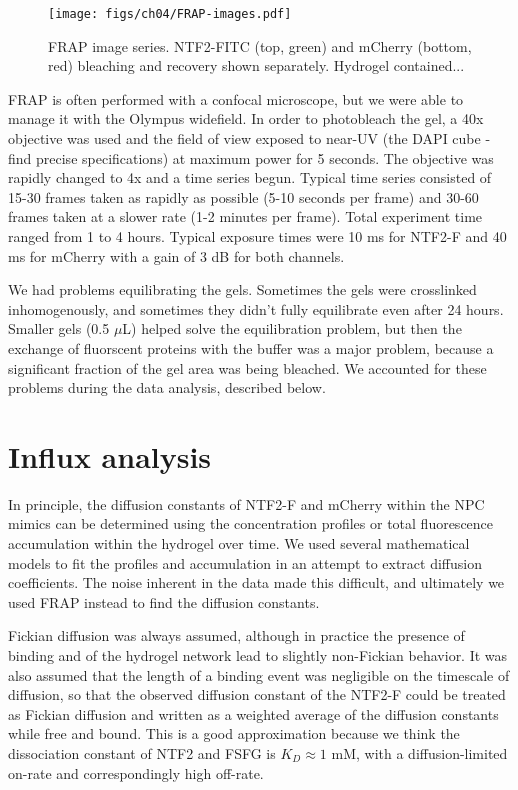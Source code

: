 \begin{figure} %

\caption{FRAP image series. NTF2-FITC (top, green) and mCherry (bottom, red) bleaching and recovery shown separately.  Hydrogel contained... }
\centering
\texttt{[image: figs/ch04/FRAP-images.pdf]}
\label{fig:frap-images}
\end{figure} 

FRAP is often performed with a confocal microscope, but we were able to manage it with the Olympus widefield.  In order to photobleach the gel, a 40x objective was used and the field of view exposed to near-UV (the DAPI cube - find precise specifications) at maximum power for 5 seconds.  The objective was rapidly changed to 4x and a time series begun.  Typical time series consisted of 15-30 frames taken as rapidly as possible (5-10 seconds per frame) and 30-60 frames taken at a slower rate (1-2 minutes per frame).  Total experiment time ranged from 1 to 4 hours.  Typical exposure times were 10 ms for NTF2-F and 40 ms for mCherry with a gain of 3 dB for both channels.

We had problems equilibrating the gels.  Sometimes the gels were crosslinked inhomogenously, and sometimes they didn't fully equilibrate even after 24 hours.  Smaller gels (0.5 $\mu$L) helped solve the equilibration problem, but then the exchange of fluorscent proteins with the buffer was a major problem, because a significant fraction of the gel area was being bleached.  We accounted for these problems during the data analysis, described below.

\section{Influx analysis}
In principle, the diffusion constants of NTF2-F and mCherry within the NPC mimics can be determined using the concentration profiles or total fluorescence accumulation within the hydrogel over time.  We used several mathematical models to fit the profiles and accumulation in an attempt to extract diffusion coefficients.  The noise inherent in the data made this difficult, and ultimately we used FRAP instead to find the diffusion constants.

Fickian diffusion was always assumed, although in practice the presence of binding and of the hydrogel network lead to slightly non-Fickian behavior.  It was also assumed that the length of a binding event was negligible on the timescale of diffusion, so that the observed diffusion constant of the NTF2-F could be treated as Fickian diffusion and written as a weighted average of the diffusion constants while free and bound.  This is a good approximation because we think the dissociation constant of NTF2 and FSFG is $K_D \approx 1$ mM, with a diffusion-limited on-rate and correspondingly high off-rate.
